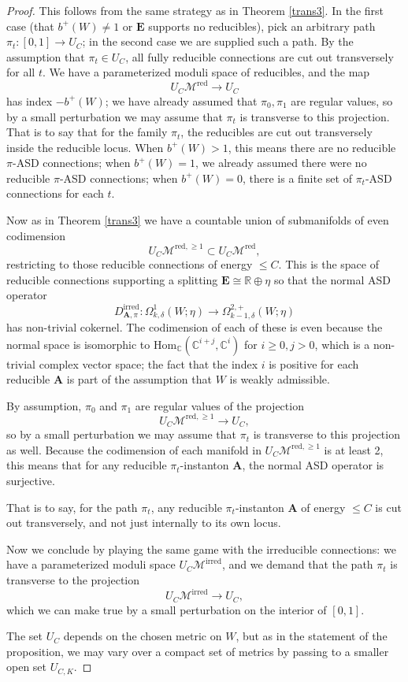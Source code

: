 \documentclass[10pt,a4paper]{amsart}
\theoremstyle{definition}
\theoremstyle{remark}
\numberwithin{figure}{qchap}
\begin{document}
\begin{proof}This follows from the same strategy as in Theorem \ref{trans3}. In the first case (that $b^+(W) \neq 1$ or $\mathbf{E}$ supports no reducibles), pick an arbitrary path $\pi_t: [0,1] \to U_C$; in the second case we are supplied such a path. By the assumption that $\pi_t \in U_C$, all fully reducible connections are cut out transversely for all $t$. We have a parameterized moduli space of reducibles, and the map
$$U_C \mathcal M^{\text{red}} \to U_C$$
has index $-b^+(W)$; we have already assumed that $\pi_0, \pi_1$ are regular values, so by a small perturbation we may assume that $\pi_t$ is transverse to this projection. That is to say that for the family $\pi_t$, the reducibles are cut out transversely inside the reducible locus. When $b^+(W) > 1$, this means there are no reducible $\pi$-ASD connections; when $b^+(W) = 1$, we already assumed there were no reducible $\pi$-ASD connections; when $b^+(W) = 0$, there is a finite set of $\pi_t$-ASD connections for each $t$.

Now as in Theorem \ref{trans3} we have a countable union of submanifolds of even codimension
$$U_C\mathcal M^{\text{red},\geq 1} \subset U_C \mathcal M^{\text{red}},$$
restricting to those reducible connections of energy $\leq C$. This is the space of reducible connections supporting a splitting $\mathbf{E} \cong \mathbb R \oplus \eta$ so that the normal ASD operator
$$D^{\text{irred}}_{\mathbf{A},\pi}: \Omega^1_{k,\delta}(W;\eta) \to \Omega^{2,+}_{k-1,\delta}(W;\eta)$$
has non-trivial cokernel. The codimension of each of these is even because the normal space is isomorphic to $\text{Hom}_{\mathbb C}(\mathbb C^{i+j}, \mathbb C^i)$ for $i \geq 0, j > 0$, which is a non-trivial complex vector space; the fact that the index $i$ is positive for each reducible $\mathbf{A}$ is part of the assumption that $W$ is weakly admissible.

By assumption, $\pi_0$ and $\pi_1$ are regular values of the projection
$$U_C\mathcal M^{\text{red},\geq 1} \to U_C,$$
so by a small perturbation we may assume that $\pi_t$ is transverse to this projection as well. Because the codimension of each manifold in $U_C\mathcal M^{\text{red},\geq 1}$ is at least 2, this means that for any reducible $\pi_t$-instanton $\mathbf{A}$, the normal ASD operator is surjective.

That is to say, for the path $\pi_t$, any reducible $\pi_t$-instanton $\mathbf{A}$ of energy $\leq C$ is cut out transversely, and not just internally to its own locus.

Now we conclude by playing the same game with the irreducible connections: we have a parameterized moduli space $U_C \mathcal M^{\text{irred}}$, and we demand that the path $\pi_t$ is transverse to the projection
$$U_C \mathcal M^{\text{irred}} \to U_C,$$
which we can make true by a small perturbation on the interior of $[0,1]$.

The set $U_C$ depends on the chosen metric on $W$, but as in the statement of the proposition, we may vary over a compact set of metrics by passing to a smaller open set $U_{C,K}$.
\end{proof}
\end{document}
